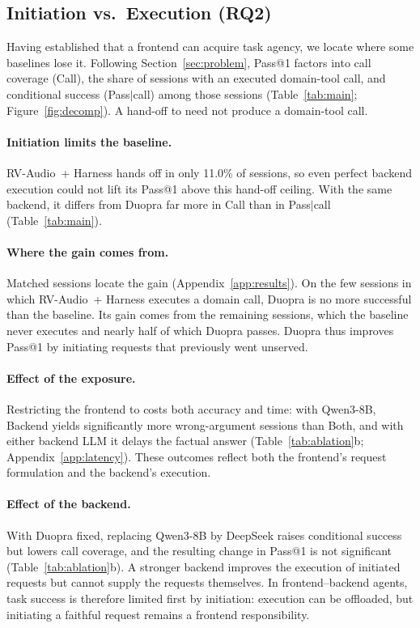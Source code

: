\subsection{Initiation vs.\ Execution (RQ2)}
\label{sec:diagnosis}

Having established that a frontend can acquire task agency, we locate where some baselines lose it.
Following Section~\ref{sec:problem}, Pass@1 factors into call coverage (Call), the share of sessions with an executed domain-tool call, and conditional success (Pass$|$call) among those sessions (Table~\ref{tab:main}; Figure~\ref{fig:decomp}).
A hand-off to  need not produce a domain-tool call.

\paragraph{Initiation limits the baseline.}
RV-Audio~+ Harness hands off in only 11.0\% of sessions, so even perfect backend execution could not lift its Pass@1 above this hand-off ceiling.
With the same backend, it differs from Duopra far more in Call than in Pass$|$call (Table~\ref{tab:main}).

\paragraph{Where the gain comes from.}
Matched sessions locate the gain (Appendix~\ref{app:results}).
On the few sessions in which RV-Audio~+ Harness executes a domain call, Duopra is no more successful than the baseline.
Its gain comes from the remaining sessions, which the baseline never executes and nearly half of which Duopra passes.
Duopra thus improves Pass@1 by initiating requests that previously went unserved.

\paragraph{Effect of the exposure.}
Restricting the frontend to  costs both accuracy and time: with Qwen3-8B, Backend yields significantly more wrong-argument sessions than Both, and with either backend LLM it delays the factual answer (Table~\ref{tab:ablation}b; Appendix~\ref{app:latency}).
These outcomes reflect both the frontend's request formulation and the backend's execution.

\paragraph{Effect of the backend.}
With Duopra fixed, replacing Qwen3-8B by DeepSeek raises conditional success but lowers call coverage, and the resulting change in Pass@1 is not significant (Table~\ref{tab:ablation}b).
A stronger backend improves the execution of initiated requests but cannot supply the requests themselves.
In frontend--backend agents, task success is therefore limited first by initiation: execution can be offloaded, but initiating a faithful request remains a frontend responsibility.

